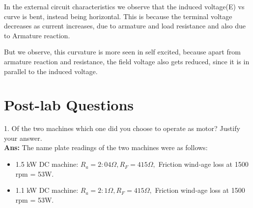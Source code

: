 \documentclass[12pt]{article}
\begin{document}
    In the external circuit characteristics we observe that the induced voltage(E) vs curve is bent, instead being horizontal. This is because the terminal voltage decreases as current increases, due to armature and load resistance and also due to Armature reaction.
    
    But we observe, this curvature is more seen in self excited, because apart from armature reaction and resistance, the field voltage also gets reduced, since it is in parallel to the induced voltage.
    \section{Post-lab Questions}
     1. Of the two machines which one did you choose to operate as motor? Justify your answer.\vspace{0.1cm}\\
    \textbf{Ans:} The name plate readings of the two machines were as follows:
    \begin{itemize}
    \item 1.5 kW DC machine: $R_a = 2:04\Omega, R_F = 415\Omega,$ Friction wind-age loss at 1500 rpm = 53W. 
    \item 1.1 kW DC machine: $R_a = 2:1\Omega, R_F = 415\Omega,$ Friction wind-age loss at 1500 rpm = 53W.
    \end{itemize}
    
\end{document}

